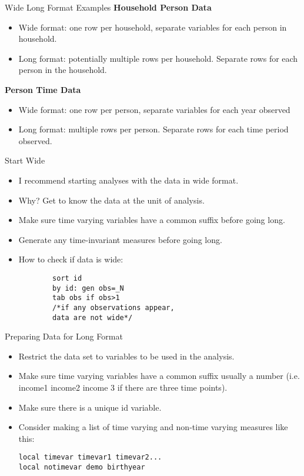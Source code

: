 \documentclass{beamer}
\begin{document}
\begin{frame}[fragile]{Wide Long Format Examples}
\textbf{Household Person Data}
\begin{itemize}
    \item Wide format: one row per household, separate variables for each person in household.
    \item Long format: potentially multiple rows per household.  Separate rows for each person in the household.
\end{itemize}
\textbf {Person Time Data}
\begin{itemize}
    \item Wide format: one row per person, separate variables for each year observed
    \item Long format: multiple rows per person.  Separate rows for each time period observed.
\end{itemize}
\end{frame}
\begin{frame}[fragile]{Start Wide}
\begin{itemize}
    \item I recommend starting analyses with the data in wide format.  
    \item Why?  Get to know the data at the unit of analysis.  
    \item Make sure time varying variables have a common suffix before going long.
    \item Generate any time-invariant measures before going long.
    \item How to check if data is wide:
    \begin{verbatim}
        sort id
        by id: gen obs=_N
        tab obs if obs>1
        /*if any observations appear, 
        data are not wide*/
    \end{verbatim}
\end{itemize}
\end{frame}
\begin{frame}[fragile]{Preparing Data for Long Format}
\begin{itemize}
    \item Restrict the data set to variables to be used in the analysis.
    \item Make sure time varying variables have a common suffix usually a number (i.e. income1 income2 income 3 if there are three time points).
    \item Make sure there is a unique id variable.  
    \item Consider making a list of time varying and non-time varying measures like this:
    \begin{verbatim}
local timevar timevar1 timevar2...
local notimevar demo birthyear 
    \end{verbatim}
\end{itemize}
\end{frame}
\end{document}
